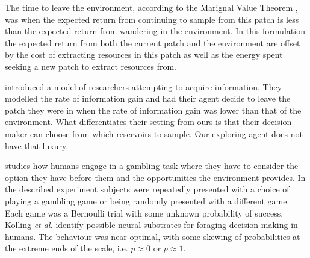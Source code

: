 The time to leave the environment, according to the Marignal Value Theorem
\cite{charnov1973optimal}, was when the expected return from continuing to
sample from this patch is less than the expected return from wandering in the
environment.  In this formulation the expected return from both the current
patch and the environment are offset by the cost of extracting resources in
this patch as well as the energy spent seeking a new patch to extract resources
from.

 


\cite{pirolli1999information} introduced a model of researchers attempting to
acquire information.  They modelled the rate of information gain and had their
agent decide to leave the patch they were in when the rate of information gain
was lower than that of the environment.  What differentiates their setting from
ours is that their decision maker can choose from which reservoirs to sample.  Our exploring agent does not have that luxury.


\cite{kolling2012neural} studies how humans engage in a gambling task where
they have to consider the option they have before them and the opportunities
the environment provides.  In the described experiment subjects were repeatedly
presented with a choice of playing a gambling game or being randomly presented
with a different game.  Each game was a Bernoulli trial with some unknown
probability of success.  Kolling \emph{et al.} identify possible neural
substrates for foraging decision making in humans.  The behaviour was near
optimal, with some skewing of probabilities at the extreme ends of the scale,
i.e. $p \approx 0$ or $p \approx 1$.


